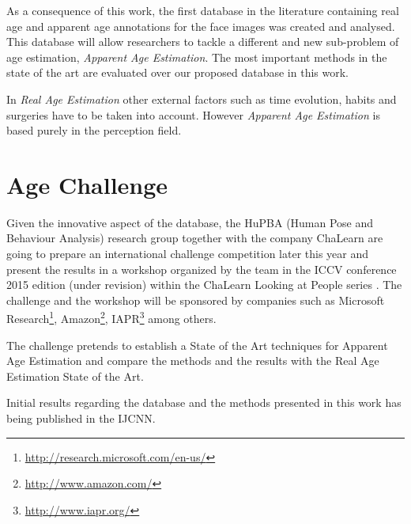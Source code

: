 As a consequence of this work, the first database in the literature containing real age and apparent age annotations for the face images was created and analysed. This database will allow researchers to tackle a different and new sub-problem of age estimation, \textit{Apparent Age Estimation}. The most important methods in the state of the art are evaluated over our proposed database in this work.

In \textit{Real Age Estimation} other external factors such as time evolution, habits and surgeries have to be taken into account. However \textit{Apparent Age Estimation} is based purely in the perception field.


\section{Age Challenge}

Given the innovative aspect of the database, the HuPBA (Human Pose and Behaviour Analysis) research group \cite{HuPBA} together with the company ChaLearn \cite{ChaLearn} are going to prepare an international challenge competition later this year and present the results in a workshop organized by the team in the ICCV conference 2015 edition (under revision) within the ChaLearn Looking at People series \cite{LaP} \cite{SergioEscalera2014} \cite{Escalera:2013:MGR:2522848.2532595} \cite{conf/icmi/EscaleraGBRGAESASBS13}. The challenge and the workshop will be sponsored by companies such as Microsoft Research\footnote{\url{http://research.microsoft.com/en-us/}}, Amazon\footnote{\url{http://www.amazon.com/}}, IAPR\footnote{\url{http://www.iapr.org/}} among others.

The challenge pretends to establish a State of the Art techniques for Apparent Age Estimation and compare the methods and the results with the Real Age Estimation State of the Art.

Initial results regarding the database and the methods presented in this work has being published in the IJCNN.


